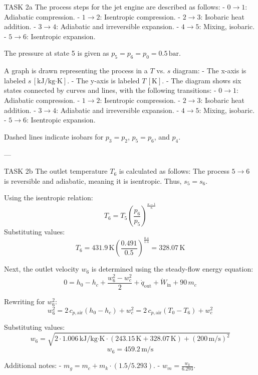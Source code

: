 TASK 2a  
The process steps for the jet engine are described as follows:  
- \( 0 \rightarrow 1 \): Adiabatic compression.  
- \( 1 \rightarrow 2 \): Isentropic compression.  
- \( 2 \rightarrow 3 \): Isobaric heat addition.  
- \( 3 \rightarrow 4 \): Adiabatic and irreversible expansion.  
- \( 4 \rightarrow 5 \): Mixing, isobaric.  
- \( 5 \rightarrow 6 \): Isentropic expansion.  

The pressure at state 5 is given as \( p_5 = p_6 = p_0 = 0.5 \, \text{bar} \).  

A graph is drawn representing the process in a \( T \) vs. \( s \) diagram:  
- The x-axis is labeled \( s \, [\text{kJ/kg·K}] \).  
- The y-axis is labeled \( T \, [\text{K}] \).  
- The diagram shows six states connected by curves and lines, with the following transitions:  
  - \( 0 \rightarrow 1 \): Adiabatic compression.  
  - \( 1 \rightarrow 2 \): Isentropic compression.  
  - \( 2 \rightarrow 3 \): Isobaric heat addition.  
  - \( 3 \rightarrow 4 \): Adiabatic and irreversible expansion.  
  - \( 4 \rightarrow 5 \): Mixing, isobaric.  
  - \( 5 \rightarrow 6 \): Isentropic expansion.  

Dashed lines indicate isobars for \( p_3 = p_2 \), \( p_5 = p_6 \), and \( p_4 \).  

---

TASK 2b  
The outlet temperature \( T_6 \) is calculated as follows:  
The process \( 5 \rightarrow 6 \) is reversible and adiabatic, meaning it is isentropic. Thus, \( s_5 = s_6 \).  

Using the isentropic relation:  
\[
T_6 = T_5 \left( \frac{p_6}{p_5} \right)^{\frac{\kappa - 1}{\kappa}}
\]  
Substituting values:  
\[
T_6 = 431.9 \, \text{K} \left( \frac{0.491}{0.5} \right)^{\frac{0.4}{1.4}} = 328.07 \, \text{K}
\]  

Next, the outlet velocity \( w_6 \) is determined using the steady-flow energy equation:  
\[
0 = h_0 - h_c + \frac{w_6^2 - w_c^2}{2} + \dot{q}_{\text{out}} + \dot{W}_{\text{in}} + 90 \, m_c
\]  

Rewriting for \( w_6^2 \):  
\[
w_6^2 = 2 \, c_{p,\text{air}} (h_0 - h_c) + w_c^2 = 2 \, c_{p,\text{air}} (T_0 - T_6) + w_c^2
\]  

Substituting values:  
\[
w_6 = \sqrt{2 \cdot 1.006 \, \text{kJ/kg·K} \cdot (243.15 \, \text{K} + 328.07 \, \text{K}) + (200 \, \text{m/s})^2}
\]  
\[
w_6 = 459.2 \, \text{m/s}
\]  

Additional notes:  
- \( m_g = m_c + m_k \cdot (1.5/5.293) \).  
- \( w_m = \frac{w_k}{6.293} \).  

